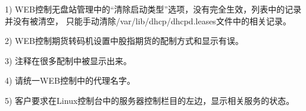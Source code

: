 1)  WEB控制无盘站管理中的“清除启动类型”选项，没有完全生效，列表中的记录并没有被清空，
只能手动清除/var/lib/dhcp/dhcpd.leases文件中的相关记录。

2)  WEB控制期货转码机设置中股指期货的配制方式和显示有误。

3)  注释在很多配制中被显示出来。

4)  请统一WEB控制中的代理名字。

5)  客户要求在Linux控制台中的服务器控制栏目的左边，显示相关服务的状态。
